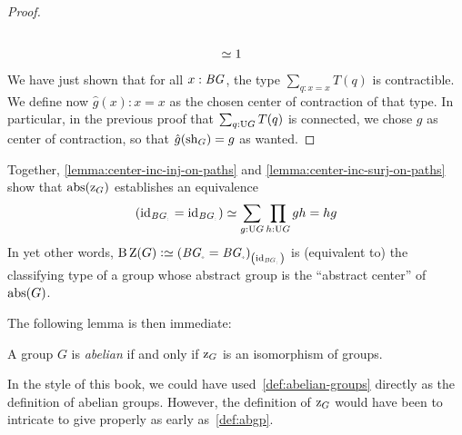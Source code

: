 \begin{proof}
\begin{displaymath}
\begin{aligned}
      \\
      &\simeq 1
    \end{aligned}
  \end{displaymath}%
  We have just shown that for all $x:\mathit{B}\mathit{G}$, the type
  $\sum_{q:x=x}T(q)$ is contractible. We define now $\hat g(x):x=x$ as
  the chosen center of contraction of that type. In particular, in the
  previous proof that $\sum_{q:\mathrm{U} G}T(q)$ is connected, we
  chose $g$ as center of contraction, so that $\hat g (\mathrm{sh}_G) = g$ as
  wanted.
\end{proof}

Together, \cref{lemma:center-inc-inj-on-paths} and
\cref{lemma:center-inc-surj-on-paths} show that
$\mathrm{abs}{(\mathrm z_{{G}})}$ establishes an equivalence
\begin{equation}
  \left( \id_{\BG_\div} = \id_{\BG_\div} \right) \weq \sum_{g:\USym G}\prod_{h:\USym G}gh=hg
\end{equation}
In yet other words,
$\B \grpcenter(G)\defequi \conncomp{(\BG_\div = \BG_\div)}
{\id_{\BG_\div}}$ is (equivalent to) the classifying type of a
group whose abstract group is the ``abstract center'' of $\mathrm{abs}(G)$.

The following lemma is then immediate:
\begin{lemma}
  \label{def:abelian-groups}%
  A group $G$ is {\em abelian} if and only if $\mathrm z_{{G}}$ is an
  isomorphism of groups.
\end{lemma}

\begin{remark}
  In the style of this book, we could have
  used~\cref{def:abelian-groups} directly as the definition of abelian
  groups. However, the definition of $\mathrm z_{{G}}$ would have been
  to intricate to give properly as early as~\cref{def:abgp}.
\end{remark}

